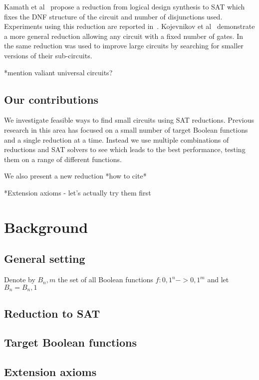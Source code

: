 \documentclass{article}
\begin{document}
Kamath et al~\cite{kamath} propose a reduction from logical design synthesis to SAT which fixes the DNF structure of the circuit and number of disjunctions used. Experiments using this reduction are reported in~\cite{estrada}. Kojevnikov et al~\cite{kulikov} demonstrate a more general reduction allowing any circuit with a fixed number of gates. In~\cite{kulikovlocal} the same reduction was used to improve large circuits by searching for smaller versions of their sub-circuits.

*mention valiant universal circuits?

\subsection{Our contributions}

We investigate feasible ways to find small circuits using SAT reductions. Previous research in this area has focused on a small number of target Boolean functions and a single reduction at a time. Instead we use multiple combinations of reductions and SAT solvers to see which leads to the best performance, testing them on a range of different functions. 

We also present a new reduction *how to cite*

*Extension axioms - let’s actually try them first


\section{Background}

\subsection{General setting}

Denote by \(B_n,m\) the set of all Boolean functions \(f: {0,1}^n -> {0,1}^m\) and let \(B_n = B_n,1\) 

\subsection{Reduction to SAT}

\subsection{Target Boolean functions}

\subsection{Extension axioms}
\end{document}
